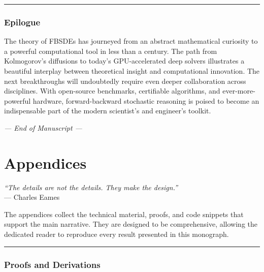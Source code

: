 \documentclass[11pt,letterpaper,oneside]{article}
\theoremstyle{plain}
\theoremstyle{definition}
\theoremstyle{remark}
\begin{document}
\bigskip\hrule\bigskip

\section*{Epilogue}

The theory of FBSDEs has journeyed from an abstract mathematical curiosity to a powerful computational tool in less than a century. The path from Kolmogorov’s diffusions to today’s GPU-accelerated deep solvers illustrates a beautiful interplay between theoretical insight and computational innovation. The next breakthroughs will undoubtedly require even deeper collaboration across disciplines. With open-source benchmarks, certifiable algorithms, and ever-more-powerful hardware, forward-backward stochastic reasoning is poised to become an indispensable part of the modern scientist's and engineer's toolkit.

\bigskip
\begin{flushright}
\emph{— End of Manuscript —}
\end{flushright}


\appendix
\part*{Appendices}
\begin{center}
\emph{“The details are not the details. They make the design.”}\\
— Charles Eames
\end{center}
\bigskip

The appendices collect the technical material, proofs, and code snippets that support the main narrative. They are designed to be comprehensive, allowing the dedicated reader to reproduce every result presented in this monograph.

\bigskip
\hrule
\bigskip

\newpage

\section{Proofs and Derivations}
\label{app:proofs}
\end{document}
